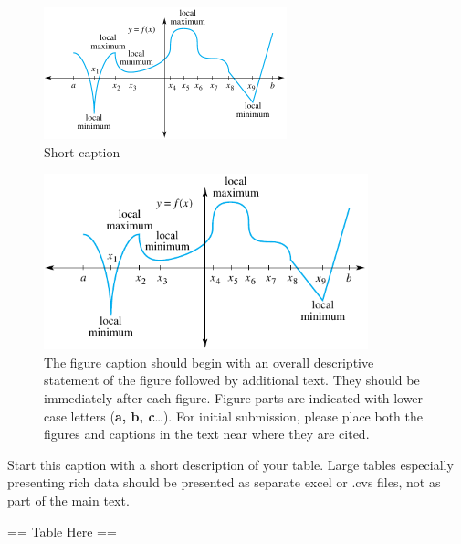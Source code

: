 %
%
%
%

\begin{figure}[h]
%
%
\centerline{\includegraphics[height=1.5in]{figsamp}}
\caption{Short caption}
\label{figone}
\end{figure}

\begin{figure}[h]
\centerline{\includegraphics[angle=45,height=2in]{figsamp}}
\caption{The figure caption should begin with an overall descriptive
statement of the figure followed by additional text. They should be
immediately after each figure.  Figure parts are indicated with
lower-case letters ({\bf a, b, c}\ldots).  For initial submission, please place
both the figures and captions in the text near where they are cited.}
\label{fig:mean_and_slope}
\end{figure}


\begin{table}
\caption{Start this caption with a short description of your
table.
Large tables
especially presenting rich data should be presented as separate excel
or .cvs files, not as part of the main text.}
== Table Here ==
\end{table}

